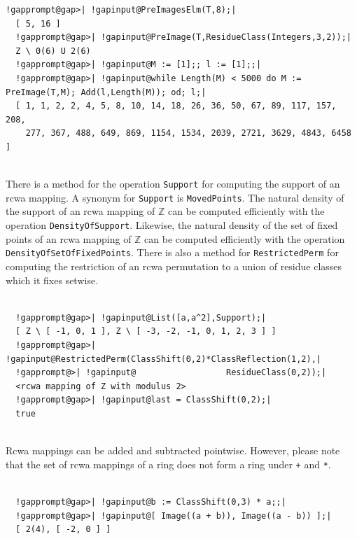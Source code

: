 \documentclass[a4paper,11pt]{report}
\begin{document}
{{\begin{Verbatim}[commandchars=!@|,fontsize=\small,frame=single,label=Example]
  !gapprompt@gap>| !gapinput@PreImagesElm(T,8);|
  [ 5, 16 ]
  !gapprompt@gap>| !gapinput@PreImage(T,ResidueClass(Integers,3,2));|
  Z \ 0(6) U 2(6)
  !gapprompt@gap>| !gapinput@M := [1];; l := [1];;|
  !gapprompt@gap>| !gapinput@while Length(M) < 5000 do M := PreImage(T,M); Add(l,Length(M)); od; l;|
  [ 1, 1, 2, 2, 4, 5, 8, 10, 14, 18, 26, 36, 50, 67, 89, 117, 157, 208, 
    277, 367, 488, 649, 869, 1154, 1534, 2039, 2721, 3629, 4843, 6458 ]
  
\end{Verbatim}
      There is a method for the operation \texttt{Support} for computing the support of an rcwa mapping. A synonym for \texttt{Support} is \texttt{MovedPoints}. The natural density of the support of an rcwa mapping of
{\ensuremath{\mathbb Z}} can be computed efficiently with the operation \texttt{DensityOfSupport}. Likewise, the natural density of the set of fixed points of an rcwa mapping
of {\ensuremath{\mathbb Z}} can be computed efficiently with the operation \texttt{DensityOfSetOfFixedPoints}. There is also a method for \texttt{RestrictedPerm} for computing the restriction of an rcwa permutation to a union of residue
classes which it fixes setwise. 
\begin{Verbatim}[commandchars=!@|,fontsize=\small,frame=single,label=Example]
  
  !gapprompt@gap>| !gapinput@List([a,a^2],Support);|
  [ Z \ [ -1, 0, 1 ], Z \ [ -3, -2, -1, 0, 1, 2, 3 ] ]
  !gapprompt@gap>| !gapinput@RestrictedPerm(ClassShift(0,2)*ClassReflection(1,2),|
  !gapprompt@>| !gapinput@                  ResidueClass(0,2));|
  <rcwa mapping of Z with modulus 2>
  !gapprompt@gap>| !gapinput@last = ClassShift(0,2);|
  true
  
\end{Verbatim}
 Rcwa mappings can be added and subtracted pointwise. However, please note that
the set of rcwa mappings of a ring does not form a ring under \texttt{+} and \texttt{*}. 

 
\begin{Verbatim}[commandchars=!@|,fontsize=\small,frame=single,label=Example]
  
  !gapprompt@gap>| !gapinput@b := ClassShift(0,3) * a;;|
  !gapprompt@gap>| !gapinput@[ Image((a + b)), Image((a - b)) ];|
  [ 2(4), [ -2, 0 ] ]
  

\end{Verbatim}}}
\end{document}
